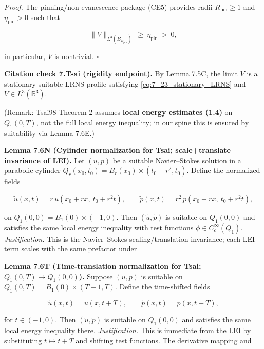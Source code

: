 \documentclass[
  11pt,
]{article}
\begin{document}
\emph{Proof.} The pinning/non-evanescence package (CE5) provides radii \(R_{\mathrm{pin}}\ge 1\) and \(\eta_{\mathrm{pin}}>0\) such that

\begin{equation}
\|V\|_{L^3(B_{R_{\mathrm{pin}}})}\ \ge\ \eta_{\mathrm{pin}}\ >\ 0,
\tag{7.40}\label{eq:7_40_pinned_nontrivial}
\end{equation}

in particular, \(V\) is nontrivial. \(\square\)

\textbf{Citation check 7.Tsai (rigidity endpoint).} By Lemma 7.5C, the limit \(V\) is a stationary suitable LRNS profile satisfying \eqref{eq:7_23_stationary_LRNS} and \(V\in L^3(\mathbb R^3)\).

(Remark: Tsai98 Theorem 2 assumes \textbf{local energy estimates (1.4)} on \(Q_1(0,T)\), not the full local energy inequality; in our spine this is ensured by suitability via Lemma 7.6E.)

\textbf{Lemma 7.6N (Cylinder normalization for Tsai; scale+translate invariance of LEI).} Let \((u,p)\) be a suitable Navier--Stokes solution in a parabolic cylinder \(Q_r(x_0,t_0)=B_r(x_0)\times(t_0-r^2,t_0)\). Define the normalized fields

\begin{equation}
\tilde u(x,t)=r\,u(x_0+r x,\ t_0+r^2 t),\qquad
\tilde p(x,t)=r^2\,p(x_0+r x,\ t_0+r^2 t),
\tag{7.37}\label{eq:7_37_norm}
\end{equation}

on \(Q_1(0,0)=B_1(0)\times(-1,0)\). Then \((\tilde u,\tilde p)\) is suitable on \(Q_1(0,0)\) and satisfies the same local energy inequality with test functions \(\phi\in C_c^\infty(Q_1)\). \emph{Justification.} This is the Navier--Stokes scaling/translation invariance; each LEI term scales with the same prefactor under

\textbf{Lemma 7.6T (Time-translation normalization for Tsai; \(Q_1(0,T)\to Q_1(0,0)\)).} Suppose \((u,p)\) is suitable on \(Q_1(0,T)=B_1(0)\times(T-1,T)\). Define the time-shifted fields

\begin{equation}
\tilde u(x,t)=u(x,t+T),\qquad \tilde p(x,t)=p(x,t+T),
\tag{7.38}\label{eq:7_38_timeshift}
\end{equation}

for \(t\in(-1,0)\). Then \((\tilde u,\tilde p)\) is suitable on \(Q_1(0,0)\) and satisfies the same local energy inequality there. \emph{Justification.} This is immediate from the LEI by substituting \(t\mapsto t+T\) and shifting test functions. The derivative mapping and
\end{document}
